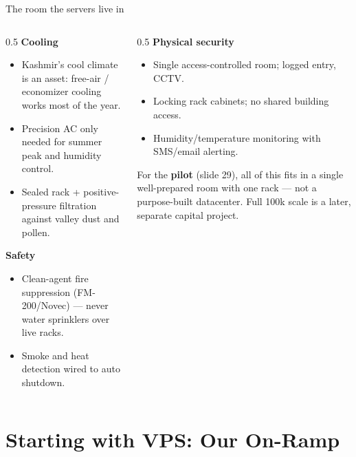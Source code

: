 \documentclass[aspectratio=169,10pt]{beamer}
\newcommand{\eyebrow}[1]{{\small\color{sovGold}\textbf{#1}}}
\newcommand{\hope}[1]{{\color{sovRed}\textbf{#1}}}
\begin{document}
\begin{frame}{The room the servers live in}
  \begin{columns}[T]
    \begin{column}{0.5\textwidth}
      \eyebrow{Cooling}
      \begin{itemize}
        \item Kashmir's cool climate is an asset: free-air / economizer cooling works most of the year.
        \item Precision AC only needed for summer peak and humidity control.
        \item Sealed rack + positive-pressure filtration against valley dust and pollen.
      \end{itemize}
      \vspace{4pt}
      \eyebrow{Safety}
      \begin{itemize}
        \item Clean-agent fire suppression (FM-200/Novec) --- never water sprinklers over live racks.
        \item Smoke and heat detection wired to auto shutdown.
      \end{itemize}
    \end{column}
    \begin{column}{0.5\textwidth}
      \eyebrow{Physical security}
      \begin{itemize}
        \item Single access-controlled room; logged entry, CCTV.
        \item Locking rack cabinets; no shared building access.
        \item Humidity/temperature monitoring with SMS/email alerting.
      \end{itemize}
      \vspace{4pt}
      \begin{takeaway}
       For the \hope{pilot} (slide 29), all of this fits in a single well-prepared room with one rack --- not a purpose-built datacenter. Full 100k scale is a later, separate capital project.
      \end{takeaway}
    \end{column}
  \end{columns}
\end{frame}

\section{Starting with VPS: Our On-Ramp}
\end{document}
